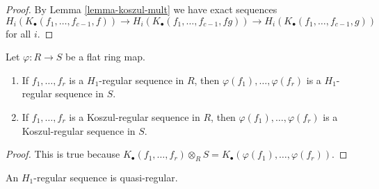 \begin{proof}
By
Lemma \ref{lemma-koszul-mult}
we have exact sequences
$$
H_i(K_\bullet(f_1, \ldots, f_{c - 1}, f)) \to
H_i(K_\bullet(f_1, \ldots, f_{c - 1}, fg)) \to
H_i(K_\bullet(f_1, \ldots, f_{c - 1}, g))
$$
for all $i$.
\end{proof}

\begin{lemma}
\label{lemma-koszul-regular-flat-base-change}
Let $\varphi : R \to S$ be a flat ring map.
\begin{enumerate}
\item If $f_1, \ldots, f_r$ is a $H_1$-regular sequence in $R$, then
$\varphi(f_1), \ldots, \varphi(f_r)$ is a $H_1$-regular sequence in $S$.
\item If $f_1, \ldots, f_r$ is a Koszul-regular sequence in $R$, then
$\varphi(f_1), \ldots, \varphi(f_r)$ is a Koszul-regular sequence in $S$.
\end{enumerate}
\end{lemma}

\begin{proof}
This is true because
$K_\bullet(f_1, \ldots, f_r) \otimes_R S =
K_\bullet(\varphi(f_1), \ldots, \varphi(f_r))$.
\end{proof}

\begin{lemma}
\label{lemma-H1-regular-quasi-regular}
An $H_1$-regular sequence is quasi-regular.
\end{lemma}

